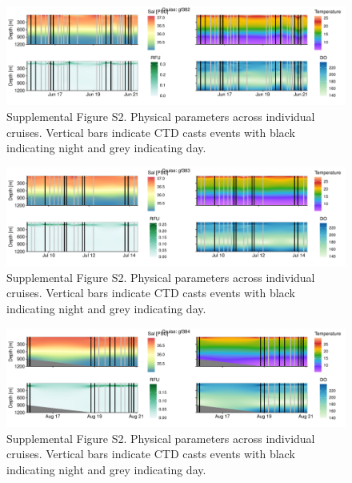 \documentclass[
]{article}
\begin{document}
\begin{figure}

{\centering \includegraphics[width=1\textwidth,height=\textheight]{index_files/figure-pdf/unnamed-chunk-19-12.pdf}

}

\caption{Supplemental Figure S2. Physical parameters across individual
cruises. Vertical bars indicate CTD casts events with black indicating
night and grey indicating day.}

\end{figure}

\begin{figure}

{\centering \includegraphics[width=1\textwidth,height=\textheight]{index_files/figure-pdf/unnamed-chunk-19-13.pdf}

}

\caption{Supplemental Figure S2. Physical parameters across individual
cruises. Vertical bars indicate CTD casts events with black indicating
night and grey indicating day.}

\end{figure}

\begin{figure}

{\centering \includegraphics[width=1\textwidth,height=\textheight]{index_files/figure-pdf/unnamed-chunk-19-14.pdf}

}

\caption{Supplemental Figure S2. Physical parameters across individual
cruises. Vertical bars indicate CTD casts events with black indicating
night and grey indicating day.}

\end{figure}
\end{document}
